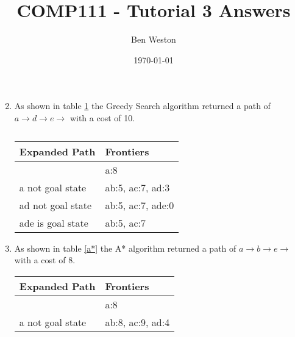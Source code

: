 \documentclass{article}
\title{COMP111 - Tutorial 3 Answers}
\author{Ben Weston}
\date{\today}
\begin{document}
\maketitle
\begin{enumerate}\setcounter{enumi}{1}
        \item{
                        As shown in table \ref{greedy} the Greedy Search algorithm returned a path of $a\rightarrow d \rightarrow e \rightarrow$ with a cost of 10.
                        \begin{table}[H]
                                \centering
                                \begin{tabular}{|l|l|}
                                        \hline
                                        Expanded Path & Frontiers\\
                                        \hline \hline
                                                      & a:8\\
                                        \hline
                                        a not goal state & ab:5, ac:7, ad:3\\
                                        \hline
                                        ad not goal state & ab:5, ac:7, ade:0\\
                                        \hline
                                        ade is goal state & ab:5, ac:7\\
                                        \hline
                                \end{tabular}
                                \caption{}\label{greedy}
                        \end{table}
                }
        \item{
                        As shown in table \ref{a*} the A* algorithm returned a path of $a\rightarrow b \rightarrow e \rightarrow$ with a cost of 8.
                        \begin{table}[H]
                                \centering
                                \begin{tabular}{|l|l|}
                                        \hline
                                        Expanded Path & Frontiers\\
                                        \hline \hline
                                                      & a:8\\
                                        \hline
                                        a not goal state & ab:8, ac:9, ad:4\\

\end{tabular}
\end{table}}
\end{enumerate}
\end{document}
